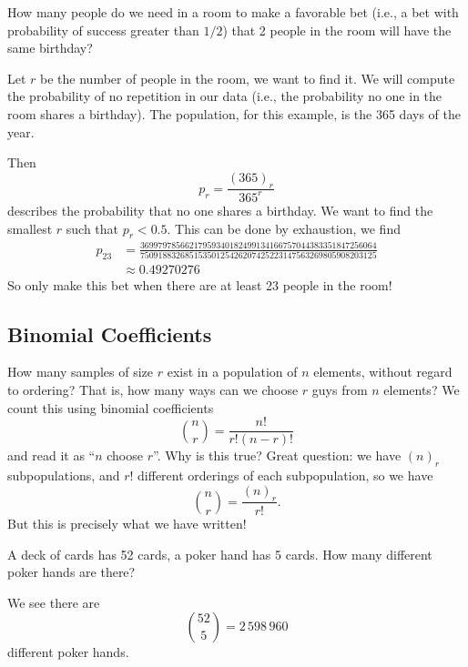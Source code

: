 How many people do we need in a room to make a favorable bet (i.e., a
bet with probability of success greater than $1/2$) that 2 people in the
room will have the same birthday?

Let $r$ be the number of people in the room, we want to find it. We will
compute the probability of no repetition in our data (i.e., the
probability no one in the room shares a birthday). The population, for
this example, is the 365 days of the year. 

Then
\begin{equation}
p_{r} = \frac{(365)_{r}}{365^{r}}
\end{equation}
describes the probability that no one shares a birthday. We want to find
the smallest $r$ such that $p_{r}<0.5$. This can be done by exhaustion,
we find
\begin{equation}
\begin{split}
p_{23} &=
\frac{36997978566217959340182499134166757044383351847256064}{75091883268515350125426207425223147563269805908203125}\\
&\approx 0.49270276
\end{split}
\end{equation}
So only make this bet when there are at least 23 people in the room!

\subsection{Binomial Coefficients}
\M
How many samples of size $r$ exist in a population of $n$ elements,
without regard to ordering? That is, how many ways can we choose $r$
guys from $n$ elements? We count this using binomial coefficients
\begin{equation}
{n \choose r} = \frac{n!}{r!(n-r)!}
\end{equation}
and read it as ``$n$ choose $r$''. Why is this true? Great question: we
have $(n)_r$ subpopulations, and $r!$ different orderings of each
subpopulation, so we have
\begin{equation}
{n\choose r}=\frac{(n)_{r}}{r!}.
\end{equation}
But this is precisely what we have written!

A deck of cards has 52 cards, a poker hand has 5 cards.
How many different poker hands are there?

We see there are
\begin{equation}
{52\choose 5}=2\,598\,960
\end{equation}
different poker hands.


